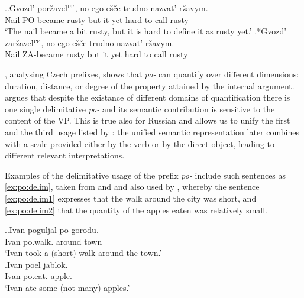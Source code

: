 \ex.\label{ex:Brag:porzhavet}\ag.Gvozd' por\v{z}avel$^{\textsc{pf}}$, no ego e\v{s}\v{c}e trudno nazvat' r\v{z}avym.\\
Nail {PO-became rusty} but it yet hard {to call} rusty\\
\trans `The nail became a bit rusty, but it is hard to define it as rusty yet.'
\bg.*Gvozd' zar\v{z}avel$^{\textsc{pf}}$, no ego e\v{s}\v{c}e trudno nazvat' r\v{z}avym.\\
Nail {ZA-became rusty} but it yet hard {to call} rusty\\

\citet{Souchkova:04}, analysing Czech prefixes, shows that \textit{po-}   can quantify over different dimensions: duration, distance, or degree of the property attained by the internal argument. \citeauthor{Souchkova:04} argues that despite the existance of different domains of quantification there is one single delimitative  \textit{po-}   and its semantic contribution is sensitive to the content of the VP. This is true also for Russian and allows us to unify the first and the third usage listed by \citet{Shvedova:82}: the unified semantic representation later combines with a scale provided either by the verb or by the direct object, leading to different relevant interpretations.

Examples of the delimitative  usage of the prefix \textit{po-}   include such sentences as \ref{ex:po:delim}, taken from \citet{Filip:00} and \citet{Souchkova:04} and also used by \citet{Kagan:book}, whereby the sentence \ref{ex:po:delim1} expresses that the walk around the city was short, and \ref{ex:po:delim2} that the quantity of the apples eaten was relatively small.

\ex.\label{ex:po:delim}\ag.\label{ex:po:delim1}Ivan poguljal po gorodu.\\
Ivan po.walk. around town\\
\trans `Ivan took a (short) walk around the town.'\\
\bg.\label{ex:po:delim2}Ivan poel jablok.\\
Ivan po.eat. apple.\\
\trans `Ivan ate some (not many) apples.'

